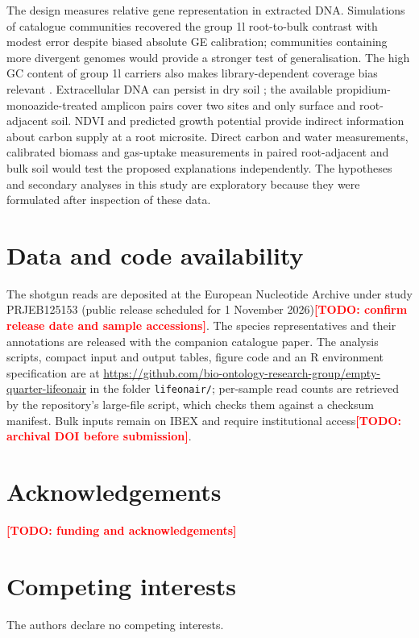 \documentclass[11pt]{article}
\providecommand{\todo}[1]{\textcolor{red}{\textbf{[TODO: #1]}}}
\begin{document}
The design measures relative gene representation in extracted DNA. Simulations of catalogue communities
recovered the group 1l root-to-bulk contrast with modest error despite biased absolute GE calibration;
communities containing more divergent genomes would provide a stronger test of generalisation.
The high GC content of group 1l carriers also makes library-dependent coverage bias relevant
\citep{browne2020gcbias}. Extracellular DNA can persist in dry soil
\citep{carini2016relicdna,lennon2018relicdna}; the available propidium-monoazide-treated amplicon pairs
cover two sites and only surface and root-adjacent soil. NDVI and predicted growth potential provide
indirect information about carbon supply at a root microsite. Direct carbon and water measurements,
calibrated biomass and gas-uptake measurements in paired root-adjacent and bulk soil would test the
proposed explanations independently. The hypotheses and secondary analyses in this study are
exploratory because they were formulated after inspection of these data.

\section*{Data and code availability}
The shotgun reads are deposited at the European Nucleotide Archive under study PRJEB125153 (public release
scheduled for 1 November 2026)\todo{confirm release date and sample accessions}. The species representatives
and their annotations are released with the companion catalogue paper. The analysis scripts, compact input
and output tables, figure code and an R environment specification are at
\url{https://github.com/bio-ontology-research-group/empty-quarter-lifeonair} in the folder \texttt{lifeonair/};
per-sample read counts are retrieved by the repository's large-file script, which checks them against a
checksum manifest. Bulk inputs remain on IBEX and require institutional access\todo{archival DOI before submission}.

\section*{Acknowledgements}
\todo{funding and acknowledgements}

\section*{Competing interests}
The authors declare no competing interests.
\end{document}

